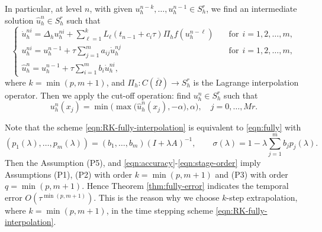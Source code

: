 
In particular, at level $n$, with given $u_h^{n-k},\ldots, u_h^{n-1}\in S_h^r$, we find an intermediate solution $\hat u_h^{n}\in S_h^r$ such that
\begin{equation}\label{eqn:RK-fully-interpolation}
    \begin{cases}
    \dot u_h^{ni} = \Delta_h u_h^{ni} +  \sum_{\ell=1}^k L_{\ell}(t_{n-1}+c_i\tau)\Pi_h f(u_h^{n-\ell}) &\quad \text{for} ~~i=1,2,\dots,m, \\ %
    u_h^{ni} = u_h^{n-1} + \tau \sum_{j=1}^m a_{ij} \dot u_h^{nj} &\quad \text{for} ~~i=1,2,\dots,m, \\
    \hat u_h^{n} = u_h^{n-1} + \tau \sum_{i=1}^m b_i \dot u_h^{ni},
  \end{cases}
\end{equation}
where $k=\min(p,m+1)$, and $\Pi_h:C(\overline\Omega)\rightarrow S_h^r$ is the Lagrange interpolation operator.
Then we apply the cut-off operation: find $u_h^n\in S_h^r$ such that
\begin{equation}\label{eqn:RK-cut}
u_h^n(x_j)  = \min\big(\max \big(\hat u_h^n(x_j), - \alpha \big) , \alpha \big),  \quad j=0,\dots,Mr.
\end{equation}


\begin{remark}\label{rem:equiv}
Note
that the scheme \eqref{eqn:RK-fully-interpolation} is equivalent to \eqref{eqn:fully} with
$$  (p_1(\lambda),\ldots,p_m(\lambda))= (b_1, \ldots, b_m) (I+\lambda A)^{-1},\qquad
 \sigma(\lambda) = 1-\lambda \sum_{j=1}^m b_j p_j(\lambda). $$
Then the Assumption (P5), and \eqref{eqn:accuracy}-\eqref{eqn:stage-order}
imply Assumptions (P1), (P2) with order $k=\min(p,m+1)$ and (P3) with order $q=\min(p,m+1)$.
Hence Theorem \ref{thm:fully-error} indicates the temporal error $O(\tau^{\min(p,m+1)})$.
This is the reason why we choose $k$-step extrapolation, where $k=\min(p,m+1)$, in the time stepping scheme \eqref{eqn:RK-fully-interpolation}.
\end{remark}


